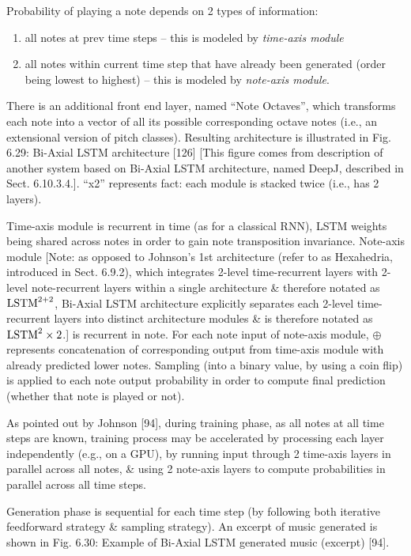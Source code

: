 \documentclass{article}
\begin{document}
\begin{itemize}
\begin{itemize}
\begin{itemize}
			Probability of playing a note depends on 2 types of information:
			\begin{enumerate}
				\item all notes at prev time steps -- this is modeled by {\it time-axis module}
				\item all notes within current time step that have already been generated (order being lowest to highest) -- this is modeled by {\it note-axis module}.
			\end{enumerate}
			There is an additional front end layer, named ``Note Octaves'', which transforms each note into a vector of all its possible corresponding octave notes (i.e., an extensional version of pitch classes). Resulting architecture is illustrated in {\sf Fig. 6.29: Bi-Axial LSTM architecture [126]} [This figure comes from description of another system based on Bi-Axial LSTM architecture, named DeepJ, described in Sect. 6.10.3.4.]. ``x2'' represents fact: each module is stacked twice (i.e., has 2 layers).

			Time-axis module is recurrent in time (as for a classical RNN), LSTM weights being shared across notes in order to gain note transposition invariance. Note-axis module [Note: as opposed to {\sc Johnson}'s 1st architecture (refer to as Hexahedria, introduced in Sect. 6.9.2), which integrates 2-level time-recurrent layers with 2-level note-recurrent layers within a single architecture \& therefore notated as ${\rm LSTM}^{2+2}$, Bi-Axial LSTM architecture explicitly separates each 2-level time-recurrent layers into distinct architecture modules \& is therefore notated as ${\rm LSTM}^2\times2$.] is recurrent in note. For each note input of note-axis module, $\oplus$ represents concatenation of corresponding output from time-axis module with already predicted lower notes. Sampling (into a binary value, by using a coin flip) is applied to each note output probability in order to compute final prediction (whether that note is played or not).

			As pointed out by Johnson [94], during training phase, as all notes at all time steps are known, training process may be accelerated by processing each layer independently (e.g., on a GPU), by running input through 2 time-axis layers in parallel across all notes, \& using 2 note-axis layers to compute probabilities in parallel across all time steps.

			Generation phase is sequential for each time step (by following both iterative feedforward strategy \& sampling strategy). An excerpt of music generated is shown in {\sf Fig. 6.30: Example of Bi-Axial LSTM generated music (excerpt) [94].}


\end{itemize}
\end{itemize}
\end{itemize}
\end{document}
